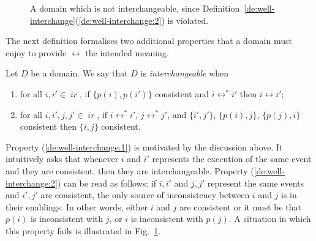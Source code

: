 \documentclass[conference]{IEEEtran}
\newcommand{\wi}{{interchangeable}}
\newcommand{\ir}[1]{\ensuremath{\mathop{\mathit{ir}({#1})}}}
\newcommand{\pred}[1]{\ensuremath{\mathit{p}({#1})}}
\begin{document}
\begin{figure}
\begin{center}
  \end{center}
  
\caption{A domain which is not {\wi}, since Definition~\ref{de:well-interchange}(\ref{de:well-interchange:2}) is violated.}
\label{fi:not-trans-cons-bis}
\end{figure}


The next definition formalises two additional properties that a domain must enjoy to provide $\leftrightarrow$ the intended meaning.

\begin{definition}[{\wi} domain]
  \label{de:well-interchange}
  Let $D$ be a domain.
  We say that $D$ is \emph{\wi} when
  \begin{enumerate}
  \item
    \label{de:well-interchange:1}
    for all $i,i' \in \ir{D}$, if $\{\pred{i}, \pred{i'}\}$ consistent
    and $i \leftrightarrow^* i'$ then $i \leftrightarrow i'$;

  \item
    \label{de:well-interchange:2} for all $i,i',j, j' \in \ir{D}$, if
    $i \leftrightarrow^* i'$, $j \leftrightarrow^* j'$,  and $\{i', j'\}$,
    $\{\pred{i}, j\}$,
    $\{\pred{j}, i\}$ consistent then $\{i, j\}$ consistent.
  \end{enumerate}
\end{definition}

Property (\ref{de:well-interchange:1}) is motivated by the discussion above. It intuitively asks that whenever $i$ and $i'$ represents the execution of the same event and they are consistent, then they are interchangeable. Property (\ref{de:well-interchange:2}) can
be read as follows: if $i, i'$ and $j, j'$ represent the same events
and $i', j'$ are consistent, the only source of inconsistency
between $i$ and $j$ is in their enablings. In other words, either $i$ and $j$ are consistent or it must be that $\pred{i}$ is inconsistent with $j$, or $i$ is inconsistent with $\pred{j}$.  A situation in which this property fails is illustrated in Fig.~\ref{fi:not-trans-cons-bis}.
\end{document}
